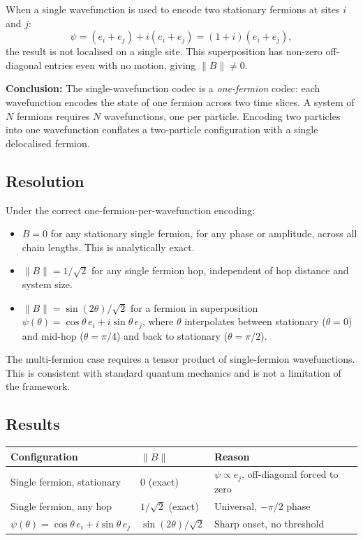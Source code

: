 \documentclass[11pt]{article}
\begin{document}
When a single wavefunction is used to encode two stationary fermions at sites $i$
and $j$:
\[
  \psi = (e_i + e_j) + i(e_i + e_j) = (1+i)(e_i + e_j),
\]
the result is not localised on a single site.
This superposition has non-zero off-diagonal entries even with no motion, giving
$\|B\| \neq 0$.

\textbf{Conclusion:} The single-wavefunction codec is a \emph{one-fermion} codec: each wavefunction
encodes the state of one fermion across two time slices.
A system of $N$ fermions requires $N$ wavefunctions, one per particle.
Encoding two particles into one wavefunction conflates a two-particle
configuration with a single delocalised fermion.

\subsection*{Resolution}

Under the correct one-fermion-per-wavefunction encoding:
\begin{itemize}
  \item $B = 0$ for any stationary single fermion, for any phase or amplitude,
        across all chain lengths. This is analytically exact.
  \item $\|B\| = 1/\sqrt{2}$ for any single fermion hop, independent of hop
        distance and system size.
  \item $\|B\| = \sin(2\theta)/\sqrt{2}$ for a fermion in superposition
        $\psi(\theta) = \cos\theta\,e_i + i\sin\theta\,e_j$,
        where $\theta$ interpolates between stationary ($\theta = 0$) and
        mid-hop ($\theta = \pi/4$) and back to stationary ($\theta = \pi/2$).
\end{itemize}

The multi-fermion case requires a tensor product of single-fermion wavefunctions.
This is consistent with standard quantum mechanics and is not a limitation of the
framework.

\subsection*{Results}

\begin{center}
\begin{tabular}{lll}
\hline
\textbf{Configuration} & $\|B\|$ & \textbf{Reason} \\
\hline
Single fermion, stationary & $0$ (exact) & $\psi \propto e_j$, off-diagonal forced to zero \\
Single fermion, any hop & $1/\sqrt{2}$ (exact) & Universal, $-\pi/2$ phase \\
$\psi(\theta) = \cos\theta\,e_i + i\sin\theta\,e_j$ & $\sin(2\theta)/\sqrt{2}$ & Sharp onset, no threshold \\
\hline
\end{tabular}
\end{center}
\end{document}
